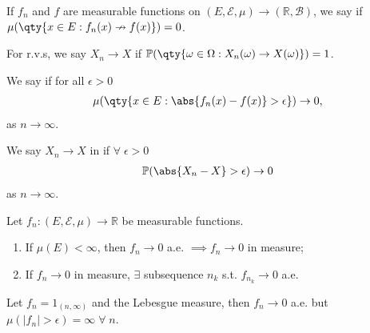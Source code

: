 \begin{definition}
	If $f_n$ and $f$ are measurable functions on $(E,\mathcal E,\mu) \to (\mathbb{R}, \mathcal{B})$, we say  if $\mu(\qty{x \in E : f_n(x) \nrightarrow f(x)}) = 0$.

	For r.v.s, we say $X_n \to X$  if $\mathbb{P}(\qty{\omega \in \Omega : X_n(\omega) \to X(\omega)}) = 1$.
\end{definition}

\begin{definition}
	We say  if for all $\epsilon > 0$
	\begin{align*}
		\mu(\qty{x\in E : \abs{f_n(x) - f(x)} > \epsilon}) \to 0,
	\end{align*} as $n \to \infty$.

	We say $X_n \to X$ in  if $\forall \; \epsilon > 0$
	\begin{align*}
		\mathbb{P}(\abs{X_n - X} > \epsilon) \to 0
	\end{align*} as $n \to \infty$.
\end{definition}

\begin{theorem} \label{thm:inprobinmeasure}
	Let $f_n \colon (E,\mathcal E,\mu) \to \mathbb R$ be measurable functions.
	\begin{enumerate}
		\item If $\mu(E) < \infty$, then $f_n \to 0$ a.e. $\implies f_n \to 0$ in measure;
		\item If $f_n \to 0$ in measure, $\exists$ subsequence $n_k$ s.t. $f_{n_k} \to 0$ a.e.
	\end{enumerate}
\end{theorem}

\begin{example}
	Let $f_n = 1_{(n, \infty)}$ and the Lebesgue measure, then $f_n \to 0$ a.e. but $\mu(|f_n| > \epsilon) = \infty \; \forall \; n$.
\end{example}


